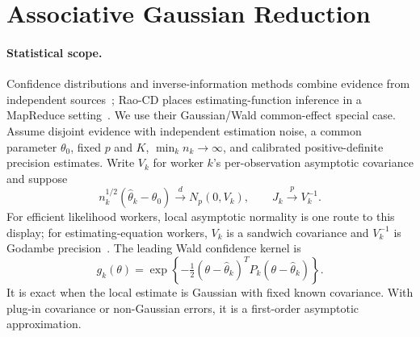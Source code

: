 \section{Associative Gaussian Reduction}
\label{sec:theory}

\paragraph{Statistical scope.}
Confidence distributions and inverse-information methods combine evidence from independent
sources~\cite{singh2005combining,xie2011meta,xie2013confidence}; Rao-CD places
estimating-function inference in a MapReduce setting~\cite{zhou2017raocd}. We use their
Gaussian/Wald common-effect special case. Assume disjoint evidence with independent estimation
noise, a common parameter $\theta_0$, fixed $p$ and $K$, $\min_k n_k\to\infty$, and calibrated
positive-definite precision estimates. Write $V_k$ for worker $k$'s per-observation asymptotic
covariance and suppose
\begin{equation}
n_k^{1/2}(\hat\theta_k-\theta_0)
\overset{d}{\longrightarrow}N_p(0,V_k),\qquad
J_k\overset{p}{\longrightarrow}V_k^{-1}.
\label{eq:an}
\end{equation}
For efficient likelihood workers, local asymptotic normality is one route to this display; for
estimating-equation workers, $V_k$ is a sandwich covariance and $V_k^{-1}$ is Godambe
precision~\cite{godambe1960estimating}. The leading Wald confidence kernel is
\begin{equation}
g_k(\theta)=\exp\!\left\{-\tfrac12
(\theta-\hat\theta_k)^TP_k(\theta-\hat\theta_k)\right\}.
\label{eq:factor}
\end{equation}
It is exact when the local estimate is Gaussian with fixed known covariance. With plug-in
covariance or non-Gaussian errors, it is a first-order asymptotic approximation.

